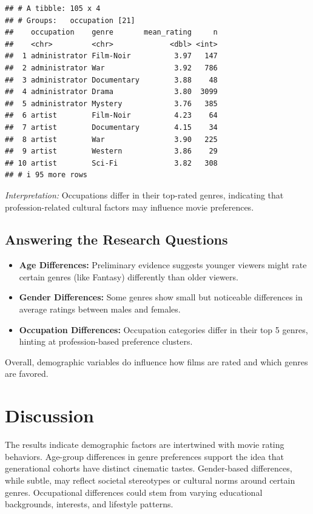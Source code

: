 \documentclass[
  man]{apa6}
\providecommand{\tightlist}{%
  \setlength{\itemsep}{0pt}\setlength{\parskip}{0pt}}
\begin{document}
\begin{verbatim}
## # A tibble: 105 x 4
## # Groups:   occupation [21]
##    occupation    genre       mean_rating     n
##    <chr>         <chr>             <dbl> <int>
##  1 administrator Film-Noir          3.97   147
##  2 administrator War                3.92   786
##  3 administrator Documentary        3.88    48
##  4 administrator Drama              3.80  3099
##  5 administrator Mystery            3.76   385
##  6 artist        Film-Noir          4.23    64
##  7 artist        Documentary        4.15    34
##  8 artist        War                3.90   225
##  9 artist        Western            3.86    29
## 10 artist        Sci-Fi             3.82   308
## # i 95 more rows
\end{verbatim}

\emph{Interpretation:} Occupations differ in their top-rated genres, indicating that profession-related cultural factors may influence movie preferences.

\subsection{Answering the Research Questions}\label{answering-the-research-questions}

\begin{itemize}
\tightlist
\item
  \textbf{Age Differences:} Preliminary evidence suggests younger viewers might rate certain genres (like Fantasy) differently than older viewers.\\
\item
  \textbf{Gender Differences:} Some genres show small but noticeable differences in average ratings between males and females.\\
\item
  \textbf{Occupation Differences:} Occupation categories differ in their top 5 genres, hinting at profession-based preference clusters.
\end{itemize}

Overall, demographic variables do influence how films are rated and which genres are favored.

\section{Discussion}\label{discussion}

The results indicate demographic factors are intertwined with movie rating behaviors. Age-group differences in genre preferences support the idea that generational cohorts have distinct cinematic tastes. Gender-based differences, while subtle, may reflect societal stereotypes or cultural norms around certain genres. Occupational differences could stem from varying educational backgrounds, interests, and lifestyle patterns.
\end{document}
